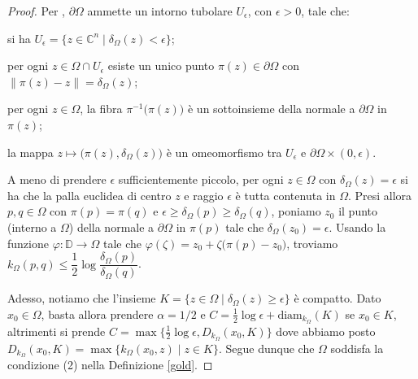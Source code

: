 \begin{proof}
    Per \cite[Lemma 2.1]{BB}, $\partial\Omega$ ammette un intorno tubolare $U_\epsilon$, con $\epsilon>0$, tale che:
    \begin{nlist}
        \item si ha $U_\epsilon=\{z\in\mathbb{C}^n\mid\delta_\Omega(z)<\epsilon\}$;
        \item per ogni $z\in\Omega\cap U_\epsilon$ esiste un unico punto $\pi(z)\in\partial\Omega$ con $\|\pi(z)-z\|=\delta_\Omega(z)$;
        \item per ogni $z\in\Omega$, la fibra $\pi^{-1}\big(\pi(z)\big)$ è un sottoinsieme della normale a $\partial\Omega$ in $\pi(z)$;
        \item la mappa $z\longmapsto\big(\pi(z),\delta_\Omega(z)\big)$ è un omeomorfismo tra $U_\epsilon$ e $\partial\Omega\times(0,\epsilon)$.
    \end{nlist}
    A meno di prendere $\epsilon$ sufficientemente piccolo, per ogni $z\in\Omega$ con $\delta_\Omega(z)=\epsilon$ si ha che la palla euclidea di centro $z$ e raggio $\epsilon$ è tutta contenuta in $\Omega$. Presi allora $p,q\in\Omega$ con $\pi(p)=\pi(q)$ e $\epsilon\ge\delta_\Omega(p)\ge\delta_\Omega(q)$, poniamo $z_0$ il punto (interno a $\Omega$) della normale a $\partial\Omega$ in $\pi(p)$ tale che $\delta_\Omega(z_0)=\epsilon$. Usando la funzione $\varphi:\mathbb{D}\longrightarrow\Omega$ tale che $\varphi(\zeta)=z_0+\zeta\big(\pi(p)-z_0\big)$, troviamo $k_\Omega(p,q) \le \dfrac{1}{2}\log{\dfrac{\delta_\Omega(p)}{\delta_\Omega(q)}}$.

    Adesso, notiamo che l'insieme $K=\{z\in\Omega\mid\delta_\Omega(z)\ge\epsilon\}$ è compatto. Dato $x_0\in\Omega$, basta allora prendere $\alpha=1/2$ e $C=\frac{1}{2}\log{\epsilon}+\text{diam}_{k_\Omega}(K)$ se $x_0\in K$, altrimenti si prende $C=\max\{\frac{1}{2}\log{\epsilon},D_{k_{\Omega}}(x_0,K)\}$ dove abbiamo posto $D_{k_\Omega}(x_0,K)=\max\{k_\Omega(x_0,z)\mid z\in K\}$. Segue dunque che $\Omega$ soddisfa la condizione (2) nella Definizione \ref{gold}.
\end{proof}